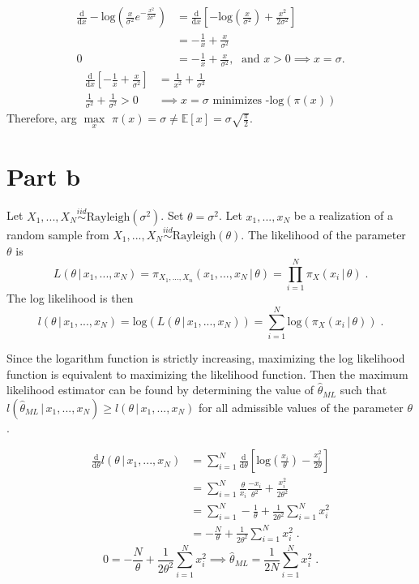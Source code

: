 \documentclass[11pt]{article}
\begin{document}
\begin{align*}
\frac{\text{d}}{\text{d}x} -\text{log}\left(\frac{x}{\sigma^2}e^{-\frac{x^2}{2\sigma^2}}\right) &=
\frac{\text{d}}{\text{d}x} \left[-\text{log}\left(\frac{x}{\sigma^2}\right) +\frac{x^2}{2\sigma^2}\right]\\
&= -\frac{1}{x} + \frac{x}{\sigma^2}\\
0 &= -\frac{1}{x} + \frac{x}{\sigma^2}, \; \text{ and } x> 0 \implies x = \sigma.
\end{align*}
\begin{align*}
\frac{\text{d}}{\text{d}x}\left[-\frac{1}{x} + \frac{x}{\sigma^2}\right] &= \frac{1}{x^2} + \frac{1}{\sigma^2}\\
\frac{1}{\sigma^2} + \frac{1}{\sigma^2} > 0 &\implies x = \sigma \text{ minimizes -log}(\pi(x))
\end{align*}
Therefore, arg $\underset{x}{\max}$ $\pi(x) = \sigma \neq \mathbb{E}[x] = \sigma\sqrt{\frac{\pi}{2}}$.

\section*{Part b}
Let $X_1,...,X_N \overset{iid}{\sim} \text{Rayleigh}(\sigma^2)$. Set $\theta = \sigma^2$. Let $x_1,...,x_N$ be a realization of a random sample from $X_1,...,X_N \overset{iid}{\sim} \text{Rayleigh}(\theta)$.  The likelihood of the parameter $\theta$ is $$L(\theta \, | \, x_1,...,x_N) = \pi_{X_1,...,X_n}(x_1,...,x_N \, | \, \theta) = \prod_{i = 1}^N \pi_X(x_i \, | \, \theta) \;.$$
The log likelihood is then 
$$l(\theta \, | \, x_1,...,x_N) = \text{log}(L(\theta \, | \, x_1,...,x_N)) = \sum_{i=1}^N \text{log}(\pi_X(x_i \, | \, \theta)) \;.$$

Since the logarithm function is strictly increasing, maximizing the log likelihood function is equivalent to maximizing the likelihood function. Then the maximum likelihood estimator  can be found by determining the value of $\hat{\theta}_{ML}$ such that $l(\hat{\theta}_{ML} \, | \, x_1,...,x_N)  \geq l(\theta \, | \, x_1,...,x_N)$ for all admissible values of the parameter $\theta$.

\begin{align*}
\frac{\text{d}}{\text{d}\theta} l(\theta \, | \, x_1,...,x_N) &= \sum_{i=1}^N \frac{\text{d}}{\text{d}\theta} \left[\text{log}\left(\frac{x_i}{\theta}\right) - \frac{x_i^2}{2\theta}\right]\\
&=\sum_{i=1}^N \frac{\theta}{x_i}\frac{-x_i}{\theta^2} + \frac{x_i^2}{2\theta^2}\\
&= \sum_{i=1}^N -\frac{1}{\theta} + \frac{1}{2\theta^2}\sum_{i=1}^N x_i^2 \\
&= -\frac{N}{\theta} + \frac{1}{2\theta^2}\sum_{i=1}^N x_i^2 \;.
\end{align*}
$$0 = -\frac{N}{\theta} + \frac{1}{2\theta^2}\sum_{i=1}^N x_i^2 \implies \hat{\theta}_{ML}  = \frac{1}{2N} \sum_{i=1}^{N} x_i^2 \;.$$
\end{document}
